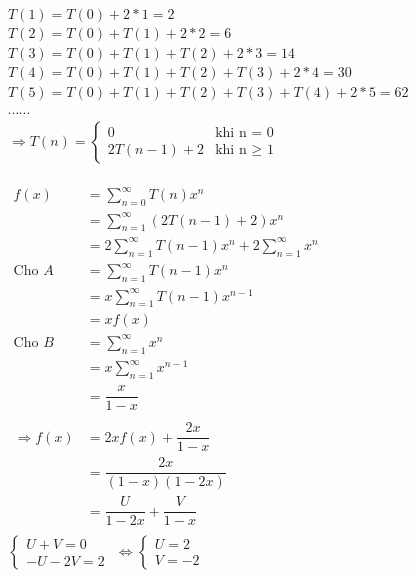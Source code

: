 \documentclass[12pt, letterpaper]{article}
\begin{document}
\begin{enumerate}
     \\
    $T(1) = T(0) + 2*1 = 2$ \\
    $T(2) = T(0) + T(1) + 2*2 = 6$ \\
    $T(3) = T(0) + T(1) + T(2) + 2*3 = 14$ \\
    $T(4) = T(0) + T(1) + T(2) + T(3) + 2*4 = 30$ \\
    $T(5) = T(0) + T(1) + T(2) + T(3) + T(4) + 2*5 = 62$ \\
    $\cdots \cdots$ \\
    $\Rightarrow T(n) =
    \begin{cases}
        0 & \text{khi n = 0} \\
        2T(n-1) + 2 & \text{khi n $\geq$ 1}
    \end{cases}$ \\ 

     \\
    $\begin{aligned}
        f(x) &= \sum_{n=0}^{\infty} T(n)x^n \\
            &= \sum_{n=1}^{\infty} (2T(n-1) + 2)x^n \\
            &= 2\sum_{n=1}^{\infty} T(n-1)x^{n} + 2\sum_{n=1}^{\infty} x^n \\
        \text{Cho } A &= \sum_{n=1}^{\infty} T(n-1)x^{n} \\
                    &= x\sum_{n=1}^{\infty} T(n-1)x^{n-1} \\
                    &= xf(x) \\
        \text{Cho } B &= \sum_{n=1}^{\infty} x^n \\
                    &= x\sum_{n=1}^{\infty} x^{n-1} \\
                    &= \dfrac{x}{1-x} \\ \\
        \Rightarrow f(x) &= 2xf(x) + \dfrac{2x}{1-x} \\
        &= \dfrac{2x}{(1-x)(1-2x)} \\
        &= \dfrac{U}{1-2x} + \dfrac{V}{1-x} \\
    \end{aligned}$ \\

    $\begin{cases}
        U + V = 0 \\
        -U - 2V = 2
    \end{cases}$
    $\Leftrightarrow \begin{cases}
        U = 2 \\
        V = -2
    \end{cases}$ \\


\end{enumerate}
\end{document}
